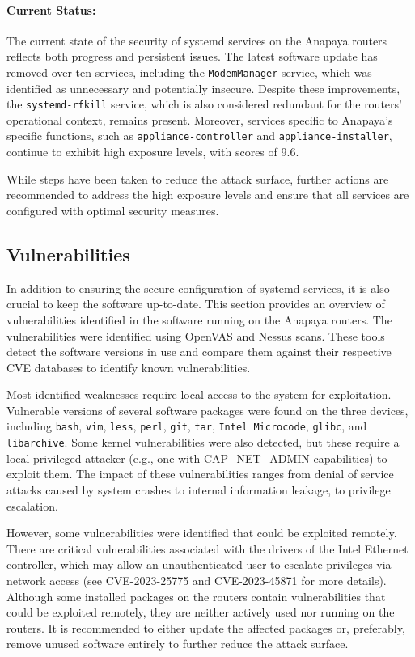 \paragraph{Current Status:}
The current state of the security of systemd services on the Anapaya routers reflects both progress and persistent issues.
The latest software update has removed over ten services, including the \texttt{ModemManager} service, which was identified as unnecessary and potentially insecure.
Despite these improvements, the \texttt{systemd-rfkill} service, which is also considered redundant for the routers' operational context, remains present.
Moreover, services specific to Anapaya's specific functions, such as \texttt{appliance-controller} and \texttt{appliance-installer}, continue to exhibit high exposure levels, with scores of 9.6.

While steps have been taken to reduce the attack surface, further actions are recommended to address the high exposure levels and ensure that all services are configured with optimal security measures.


\subsection{Vulnerabilities}
\label{sec:vulnerabilities}

In addition to ensuring the secure configuration of systemd services, it is also crucial to keep the software up-to-date.
This section provides an overview of vulnerabilities identified in the software running on the Anapaya routers.
The vulnerabilities were identified using OpenVAS and Nessus scans.
These tools detect the software versions in use and compare them against their respective CVE databases to identify known vulnerabilities.

Most identified weaknesses require local access to the system for exploitation.
Vulnerable versions of several software packages were found on the three devices, including \texttt{bash}, \texttt{vim}, \texttt{less}, \texttt{perl}, \texttt{git}, \texttt{tar}, \texttt{Intel Microcode}, \texttt{glibc}, and \texttt{libarchive}.
Some kernel vulnerabilities were also detected, but these require a local privileged attacker (e.g., one with CAP\_NET\_ADMIN capabilities) to exploit them.
The impact of these vulnerabilities ranges from denial of service attacks caused by system crashes to internal information leakage, to privilege escalation.

However, some vulnerabilities were identified that could be exploited remotely.
There are critical vulnerabilities associated with the drivers of the Intel Ethernet controller, which may allow an unauthenticated user to escalate privileges via network access (see CVE-2023-25775 and CVE-2023-45871 for more details).
Although some installed packages on the routers contain vulnerabilities that could be exploited remotely, they are neither actively used nor running on the routers.
It is recommended to either update the affected packages or, preferably, remove unused software entirely to further reduce the attack surface.

